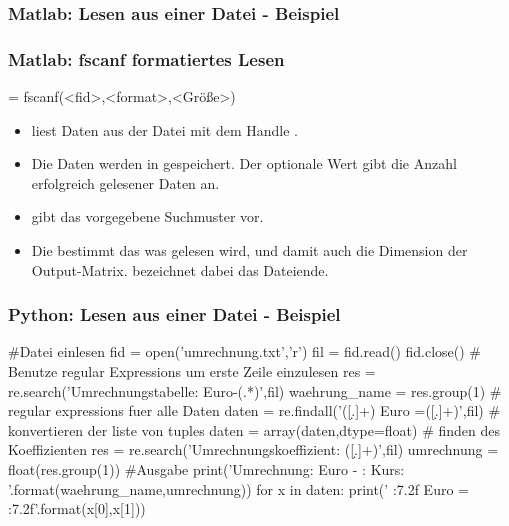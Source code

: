 \documentclass[hyperref={xetex}]{beamer}
\begin{document}
%
%
\begin{frame}[fragile]\frametitle{Matlab: Lesen aus einer Datei - Beispiel}
\end{frame}
%
%
\begin{frame}[fragile]\frametitle{Matlab: fscanf formatiertes Lesen}
\begin{matlabin}
 = fscanf(<fid>,<format>,<Größe>)
\end{matlabin}
\begin{itemize}
\item {} liest Daten aus der Datei mit dem Handle
  . 
\item Die Daten werden in  gespeichert. Der optionale Wert
   gibt die Anzahl erfolgreich gelesener Daten an.
\item {} gibt das vorgegebene Suchmuster vor.
\item Die  bestimmt das was gelesen wird, und damit auch die Dimension der Output-Matrix.  bezeichnet dabei das Dateiende.
\end{itemize}
\end{frame}
%
%
\begin{frame}[fragile]\frametitle{Python: Lesen aus einer Datei - Beispiel}
  \begin{pyin}
#Datei einlesen
fid = open('umrechnung.txt','r')
fil = fid.read()
fid.close()
# Benutze regular Expressions um erste Zeile einzulesen
res = re.search('Umrechnungstabelle: Euro-(.*)',fil)
waehrung_name = res.group(1)
# regular expressions fuer alle Daten
daten = re.findall('([\d.]+) Euro =\s*([\d.]+)',fil)
# konvertieren der liste von tuples 
daten = array(daten,dtype=float)
# finden des Koeffizienten 
res = re.search('Umrechnungskoeffizient: ([\d.]+)',fil)
umrechnung = float(res.group(1))
#Ausgabe
print('Umrechnung: Euro - {}: Kurs: {} \n'.format(waehrung_name,umrechnung))
for x in daten:
    print(' {:7.2f} Euro  = {:7.2f}'.format(x[0],x[1]))    
  \end{pyin}
\end{frame}
\end{document}
